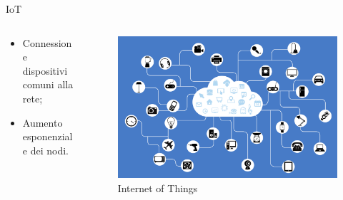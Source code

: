 \documentclass{beamer}
\begin{document}
\begin{frame}[fragile]{IoT}

\begin{columns}[T]
\begin{column}{.30\textwidth}
\newline
\begin{itemize}
    \item Connessione dispositivi comuni alla rete;\newline
		\item Aumento esponenziale dei nodi.\newline

\end{itemize}

\end{column}%
\hfill%
\begin{column}{.50\textwidth}
    \begin{figure}[t!]
    \includegraphics[scale=.08]{img/IoT.png}
    \caption{Internet of Things}
    \centering

\end{figure}
\end{column}%
\end{columns}
\end{frame}
\end{document}
